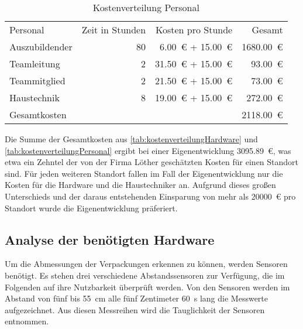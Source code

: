 \begin{table}[htbp]
  \centering
  \renewcommand{\arraystretch}{1.25}
  \caption{Kostenverteilung Personal}
  \begin{tabular}{lrrr}
    Personal       & Zeit in Stunden & Kosten pro Stunde              & Gesamt          \\
    Auszubildender & 80              & \SI{6.00}{€} + \SI{15.00}{€}   & \SI{1680.00}{€} \\
    Teamleitung    & 2               & \SI{31.50}{€}  + \SI{15.00}{€} & \SI{93.00}{€}   \\
    Teammitglied   & 2               & \SI{21.50}{€}  + \SI{15.00}{€} & \SI{73.00}{€}   \\
    Haustechnik    & 8               & \SI{19.00}{€}  + \SI{15.00}{€} & \SI{272.00}{€}  \\
    \hline
    Gesamtkosten   &                 &                                & \SI{2118.00}{€}
  \end{tabular}
  \label{tab:kostenverteilungPersonal}
\end{table}

Die Summe der Gesamtkosten aus \vref{tab:kostenverteilungHardware} und \vref{tab:kostenverteilungPersonal} ergibt bei einer Eigenentwicklung \SI{3095.89}{€}, was etwa ein Zehntel der von der Firma Löther geschätzten Kosten für einen Standort sind. Für jeden weiteren Standort fallen im Fall der Eigenentwicklung nur die Kosten für die Hardware und die Haustechniker an. Aufgrund dieses großen Unterschieds und der daraus entstehenden Einsparung von mehr als \SI{20000}{€} pro Standort wurde die Eigenentwicklung präferiert.


\subsection{Analyse der benötigten Hardware}\label{ssec:analyse:hardware}

Um die Abmessungen der Verpackungen erkennen zu können, werden Sensoren benötigt. Es stehen drei verschiedene Abstandssensoren zur Verfügung, die im Folgenden auf ihre Nutzbarkeit überprüft werden. Von den Sensoren werden im Abstand von fünf bis \SI{55}{\centi\metre} alle fünf Zentimeter \SI{60}{\second} lang die Messwerte aufgezeichnet. Aus diesen Messreihen wird die Tauglichkeit der Sensoren entnommen.

